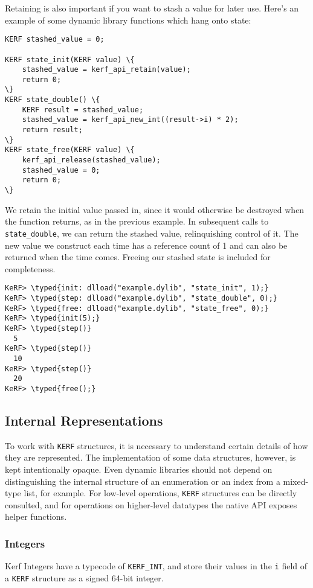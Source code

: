 \documentclass{article}
\newcommand{\typed}[1]{\textcolor{TealBlue}{#1}}
\begin{document}
\pagebreak
Retaining is also important if you want to stash a value for later use. Here's an example of some dynamic library functions which hang onto state:
\begin{Verbatim}
KERF stashed_value = 0;

KERF state_init(KERF value) \{
	stashed_value = kerf_api_retain(value);
	return 0;
\}
KERF state_double() \{
	KERF result = stashed_value;
	stashed_value = kerf_api_new_int((result->i) * 2);
	return result;
\}
KERF state_free(KERF value) \{
	kerf_api_release(stashed_value);
	stashed_value = 0;
	return 0;
\}
\end{Verbatim}
We retain the initial value passed in, since it would otherwise be destroyed when the function returns, as in the previous example. In subsequent calls to \texttt{state\_double}, we can return the stashed value, relinquishing control of it. The new value we construct each time has a reference count of 1 and can also be returned when the time comes. Freeing our stashed state is included for completeness.

\begin{Verbatim}
KeRF> \typed{init: dlload("example.dylib", "state_init", 1);}
KeRF> \typed{step: dlload("example.dylib", "state_double", 0);}
KeRF> \typed{free: dlload("example.dylib", "state_free", 0);}
KeRF> \typed{init(5);}
KeRF> \typed{step()}
  5
KeRF> \typed{step()}
  10
KeRF> \typed{step()}
  20
KeRF> \typed{free();}
\end{Verbatim}

\pagebreak
\subsection{Internal Representations}
To work with \texttt{KERF} structures, it is necessary to understand certain details of how they are represented. The implementation of some data structures, however, is kept intentionally opaque. Even dynamic libraries should not depend on distinguishing the internal structure of an enumeration or an index from a mixed-type list, for example. For low-level operations, \texttt{KERF} structures can be directly consulted, and for operations on higher-level datatypes the native API exposes helper functions.

\subsubsection{Integers}
Kerf Integers have a typecode of \texttt{KERF\_INT}, and store their values in the \texttt{i} field of a \texttt{KERF} structure as a signed 64-bit integer.
\end{document}
